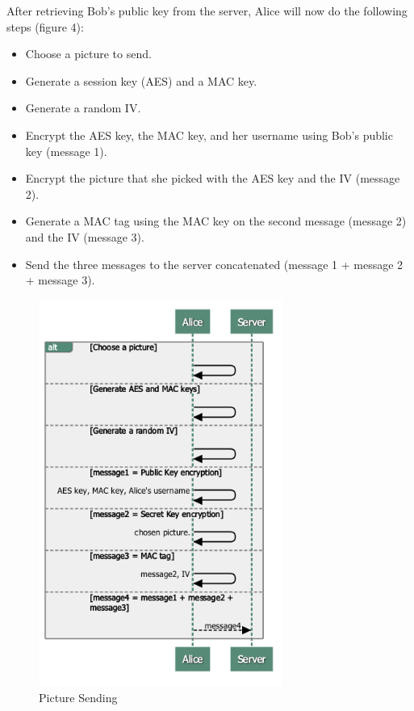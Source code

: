 	    After retrieving Bob's public key from the server, Alice will now do the following steps (figure 4):
	    
	    \begin{itemize}
	     \item Choose a picture to send.
	     \item Generate a session key (AES) and a MAC key.
	     \item Generate a random IV.
	     \item Encrypt the AES key, the MAC key, and her username using Bob's public key (message 1).
	     \item Encrypt the picture that she picked with the AES key and the IV (message 2).
	     \item Generate a MAC tag using the MAC key on the second message (message 2) and the IV (message 3).
	     \item Send the three messages to the server concatenated (message 1 + message 2 + message 3).
	    \end{itemize}
	    
	    \begin{figure}[H]
	    
	      \centering
	      \includegraphics[width=8cm]{images/architecture/picture_sending}
	      \caption{Picture Sending}
	     
	    \end{figure}
	    
